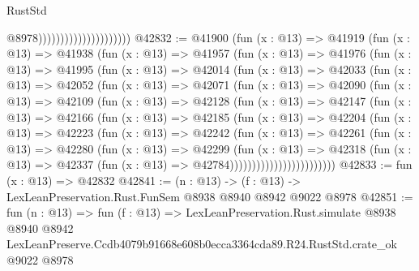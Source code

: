 \begin{lexlean}{RustStd}
\begin{coremodule}
                                              @8978)))))))))))))))))))))
@42832 := @41900
    (fun (x : @13) =>
    @41919
      (fun (x : @13) =>
      @41938
        (fun (x : @13) =>
        @41957
          (fun (x : @13) =>
          @41976
            (fun (x : @13) =>
            @41995
              (fun (x : @13) =>
              @42014
                (fun (x : @13) =>
                @42033
                  (fun (x : @13) =>
                  @42052
                    (fun (x : @13) =>
                    @42071
                      (fun (x : @13) =>
                      @42090
                        (fun (x : @13) =>
                        @42109
                          (fun (x : @13) =>
                          @42128
                            (fun (x : @13) =>
                            @42147
                              (fun (x : @13) =>
                              @42166
                                (fun (x : @13) =>
                                @42185
                                  (fun (x : @13) =>
                                  @42204
                                    (fun (x : @13) =>
                                    @42223
                                      (fun (x : @13) =>
                                      @42242
                                        (fun (x : @13) =>
                                        @42261
                                          (fun (x : @13) =>
                                          @42280
                                            (fun (x : @13) =>
                                            @42299
                                              (fun (x : @13) =>
                                              @42318
                                                (fun (x : @13) =>
                                                @42337
                                                  (fun (x : @13) => @42784))))))))))))))))))))))))
@42833 := fun (x : @13) => @42832
@42841 := (n : @13) -> (f : @13) -> LexLeanPreservation.Rust.FunSem @8938 @8940 @8942 @9022 @8978
@42851 := fun (n : @13) =>
  fun (f : @13) =>
  LexLeanPreservation.Rust.simulate
    @8938
    @8940
    @8942
    LexLeanPreserve.Ccdb4079b91668e608b0ecca3364cda89.R24.RustStd.crate_ok
    @9022
    @8978
\end{coremodule}
\end{lexlean}
